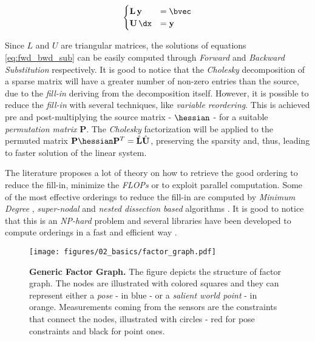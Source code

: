 \begin{equation}
    \label{eq:fwd_bwd_sub}
    \begin{cases}
        \mathbf{L}\,\mathbf{y} &= \bvec \\
        \mathbf{U}\,\dx &= \mathbf{y}
    \end{cases}
\end{equation}

\noindent Since $L$ and $U$ are triangular matrices, the solutions of equations \ref{eq:fwd_bwd_sub} can be easily computed through \textit{Forward} and \textit{Backward Substitution} respectively. It is good to notice that the \textit{Cholesky} decomposition of a sparse matrix will have a greater number of non-zero entries than the source, due to the \textit{fill-in} deriving from the decomposition itself. However, it is possible to reduce the \textit{fill-in} with several techniques, like \textit{variable reordering}. This is achieved pre and post-multiplying the source matrix - $\hessian$ - for a suitable \textit{permutation matrix} $\mathbf{P}$. The \textit{Cholesky} factorization will be applied to the permuted matrix $\mathbf{P}\hessian \mathbf{P}^T = \hat{\mathbf{L}}\hat{\mathbf{U}}$, preserving the sparsity and, thus, leading to faster solution of the linear system. 

The literature proposes a lot of theory on how to retrieve the good ordering to reduce the fill-in, minimize the \textit{FLOPs} or to exploit parallel computation. Some of the most effective orderings to reduce the fill-in are computed by \textit{Minimum Degree} \cite{amestoy1996amd, davis2004colamd}, \textit{super-nodal} \cite{cleveland1987supernodal} and \textit{nested dissection based} algorithms \cite{karypis1998metis}. It is good to notice that this is an \textit{NP-hard} problem and several libraries have been developed to compute orderings in a fast and efficient way \cite{agarwal2012variable}.

\begin{figure}[!hbt]
    \centering
    \texttt{[image: figures/02\_basics/factor\_graph.pdf]}
    \caption{\textbf{Generic Factor Graph.} The figure depicts the structure of factor graph. The nodes are illustrated with colored squares and they can represent either a \textit{pose} - in blue - or a \textit{salient world point} - in orange. Measurements coming from the sensors are the constraints that connect the nodes, illustrated with circles - red for pose constraints and black for point ones.} 
    \label{fig:factor_graph}
\end{figure}

